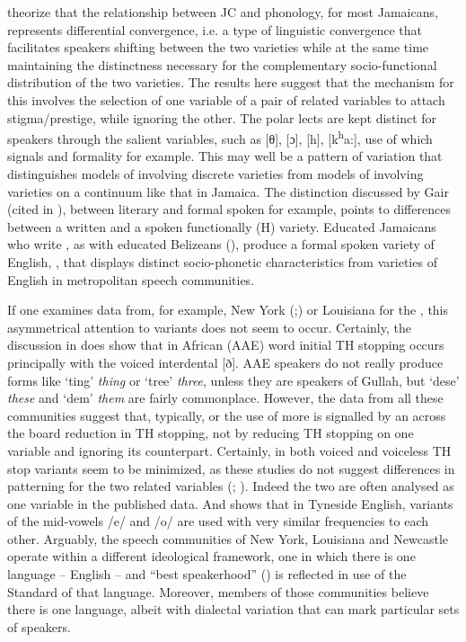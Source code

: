   \citet[271]{DevonishHarry2004} theorize that the relationship between JC and  phonology, for most Jamaicans, represents differential convergence, i.e. a type of linguistic convergence that facilitates speakers shifting between the two varieties while at the same time maintaining the distinctness necessary for the complementary socio-functional distribution of the two varieties.  The results here suggest that the mechanism for this involves the selection of one variable of a pair of related variables to attach stigma\slash prestige, while ignoring the other.  The polar lects are kept distinct for speakers through the salient variables, such as [θ], [ɔ], [h], [k\textsuperscript{h}a:], use of which signals  and formality for example.  This may well be a pattern of variation that distinguishes models of  involving discrete varieties from models of  involving varieties on a continuum like that in Jamaica.  The distinction discussed by Gair (cited in \citealt[272--273]{Paolillo1997}), between literary  and formal spoken  for example, points to differences between a written and a spoken functionally (H) variety.  Educated Jamaicans who write , as with educated Belizeans (\citealt[67--68]{Escure1997}), produce a formal spoken variety of English, , that displays distinct socio-phonetic characteristics from varieties of English in metropolitan speech communities.    

If one examines data from, for example, New York (\citealt[253]{Labov1966};\citeyear[100--104] {Labov1972}) or Louisiana \citep[254]{Dubois1998} for the , this asymmetrical attention to variants does not seem to occur.  Certainly, the discussion in \citet[119]{Green2002} does show that in African  (AAE) word initial TH stopping occurs principally with the voiced interdental [ð].  AAE speakers do not really produce forms like ‘ting’ \textit{thing} or ‘tree’ \textit{three}, unless they are speakers of Gullah, but ‘dese’ \textit{these} and ‘dem’ \textit{them} are fairly commonplace.  However, the data from all these communities suggest that, typically,  or the use of more  is signalled by an across the board reduction in TH stopping, not by reducing TH stopping on one variable and ignoring its counterpart.  Certainly, in  both voiced and voiceless TH stop variants seem to be minimized, as these studies do not suggest differences in patterning for the two related variables (\citealt[51]{Ervin-Tripp2001}; \citealt[94]{Labov2001}).  Indeed the two are often analysed as one variable in the published data.  And \citet[86--90]{Watt2000} shows that in Tyneside English, variants of the mid-vowels /e/ and /o/ are used with very similar frequencies to each other.  Arguably, the speech communities of New York, Louisiana and Newcastle operate within a different ideological framework, one in which there is one language – English – and “best speakerhood” (\citealt[286]{Silverstein1996}) is reflected in use of the Standard of that language.  Moreover, members of those communities believe there is one language, albeit with dialectal variation that can mark particular sets of speakers. 

